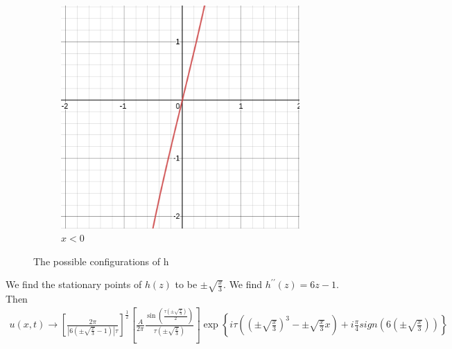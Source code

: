 \documentclass{article}
\begin{document}
\begin{figure}[H]
\begin{subfigure}[b]{40mm}
\includegraphics[scale=0.2]{figures/hN.png}
\caption{$x < 0$}
\label{fig:}
\end{subfigure}

\caption{The possible configurations of h}
\label{fig:}
\end{figure}
We find the stationary points of $h(z)$ to be $\pm\sqrt{\frac{x}{3}}$. We find $h^{\prime\prime}(z) = 6z -1$. Then 
\begin{align*}
u(x,t)\rightarrow \left[\frac{2\pi}{|6(\pm \sqrt{\frac{x}{3}} - 1)| \tau} \right]^{\frac{1}{2}} \left[ \frac{A}{2\pi} \frac{\sin\left( \frac{\tau \left(\pm \sqrt{\frac{x}{3}}\right)}{2} \right)}{\tau\left(\pm\sqrt{\frac{x}{3}}\right)} \right ] \exp\left\{i\tau\left(\left(\pm\sqrt{\frac{x}{3}}\right)^3 - \pm\sqrt{\frac{x}{3}}x \right)+ i\frac{\pi}{4}sign\left(6\left(\pm\sqrt{\frac{x}{3}}\right)\right)\right\}
\end{align*}
\end{document}
